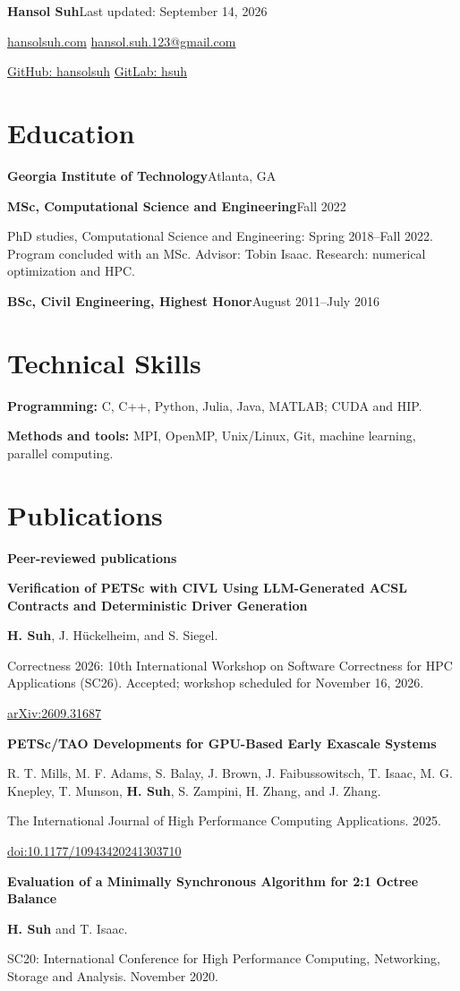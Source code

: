 \documentclass[10pt,letterpaper]{article}
\newcommand{\entry}[2]{\par\textbf{#1}\hfill #2\par}
\newcommand{\paper}[3]{\par\textbf{#1}\par #2\par #3\par}
\begin{document}
{\LARGE\bfseries Hansol Suh}\hfill Last updated: September 14, 2026\par
\href{https://hansolsuh.com}{hansolsuh.com} \quad
\href{mailto:hansol.suh.123@gmail.com}{hansol.suh.123@gmail.com}\par
\href{https://github.com/hansolsuh}{GitHub: hansolsuh} \quad
\href{https://gitlab.com/hsuh}{GitLab: hsuh}

\section{Education}
\entry{Georgia Institute of Technology}{Atlanta, GA}
\entry{MSc, Computational Science and Engineering}{Fall 2022}
PhD studies, Computational Science and Engineering: Spring 2018--Fall 2022.
Program concluded with an MSc. Advisor: Tobin Isaac. Research: numerical optimization and HPC.
\entry{BSc, Civil Engineering, Highest Honor}{August 2011--July 2016}

\section{Technical Skills}
\textbf{Programming:} C, C++, Python, Julia, Java, MATLAB; CUDA and HIP.\par
\textbf{Methods and tools:} MPI, OpenMP, Unix/Linux, Git, machine learning, parallel computing.

\section{Publications}
\textbf{Peer-reviewed publications}
\paper{Verification of PETSc with CIVL Using LLM-Generated ACSL Contracts and Deterministic Driver Generation}
{\textbf{H. Suh}, J. H\"uckelheim, and S. Siegel.}
{Correctness 2026: 10th International Workshop on Software Correctness for HPC Applications (SC26). Accepted; workshop scheduled for November 16, 2026.\par
\href{https://arxiv.org/abs/2609.31687}{arXiv:2609.31687}}
\paper{PETSc/TAO Developments for GPU-Based Early Exascale Systems}
{R. T. Mills, M. F. Adams, S. Balay, J. Brown, J. Faibussowitsch, T. Isaac, M. G. Knepley, T. Munson, \textbf{H. Suh}, S. Zampini, H. Zhang, and J. Zhang.}
{The International Journal of High Performance Computing Applications. 2025.\par
\href{https://doi.org/10.1177/10943420241303710}{doi:10.1177/10943420241303710}}
\paper{Evaluation of a Minimally Synchronous Algorithm for 2:1 Octree Balance}
{\textbf{H. Suh} and T. Isaac.}
{SC20: International Conference for High Performance Computing, Networking, Storage and Analysis. November 2020.}
\end{document}
